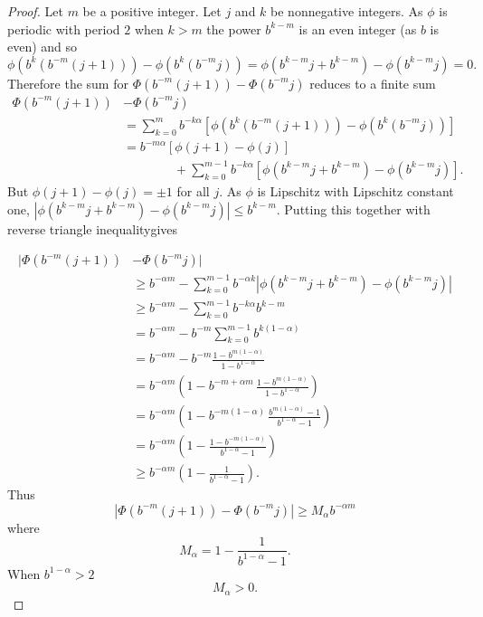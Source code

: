 \documentclass[12pt]{amsart}
\numberwithin{equation}{section}
\theoremstyle{definition}
\theoremstyle{remark}
\begin{document}
\begin{proof}
  Let $m$ be a positive integer.
  Let $j$ and $k$ be nonnegative integers.
  As $\phi$ is periodic with period $2$
  when  $k>m$ the power $b^{k-m}$ is an even integer (as $b$ is even)
  and so
$$
\phi(b^k(b^{-m}(j+1))) - \phi(b^k(b^{-m}j))
= \phi(b^{k-m}j + b^{k-m}) - \phi(b^{k-m}j) =0.
$$
Therefore the sum for $\Phi(b^{-m}(j+1))- \Phi(b^{-m}j)$ reduces to a finite
sum
\begin{align*}
  \Phi(b^{-m}(j+1))&- \Phi(b^{-m}j)
  \\
   &=
  \sum_{k=0}^m b^{-k\alpha}\left[\phi(b^k(b^{-m}(j+1))) - \phi(b^k(b^{-m}j))\right]\\
     &= b^{-m\alpha}\left[ \phi(j+1) - \phi(j)\right]\\
  &\qquad\qquad+ \sum_{k=0}^{m-1} b^{-k\alpha}
     \left[  \phi(b^{k-m}j + b^{k-m}) - \phi(b^{k-m}j)    \right]. 
\end{align*}
But $\phi(j+1) - \phi(j) = \pm 1$ for all $j$.
As  $\phi$ is Lipschitz with
Lipschitz constant one, 
$|\phi(b^{k-m}j + b^{k-m}) - \phi(b^{k-m}j)   |  \le  b^{k-m}$.
Putting this together with reverse triangle inequalitygives


\begingroup
\allowdisplaybreaks
\begin{align*}
    |\Phi(b^{-m}(j+1))&- \Phi(b^{-m}j)|\\
 &\ge  b^{-\alpha m} - \sum_{k=0}^{m-1} b^{-\alpha k} | \phi(b^{k-m}j + b^{k-m}) - \phi(b^{k-m}j)  |\\
 &\ge b^{-\alpha m} - \sum_{k=0}^{m-1} b^{-k\alpha} b^{k-m}\\
&= b^{-\alpha m} - b^{-m} \sum_{k=0}^{m-1} b^{k(1-\alpha)} \\
&= b^{-\alpha m} - b^{-m}                    
           \frac{1 - b^{m(1-\alpha)}}{1 - b^{1-\alpha}} \\
&= b^{-\alpha m} \left( 1 - b^{-m + \alpha m}\,  
                \frac{1 - b^{m(1-\alpha)}}{1 - b^{1-\alpha}}\right) \\
&= b^{-\alpha m} \left( 1 - b^{-m(1-\alpha)}\,  
                \frac{ b^{m(1-\alpha)}-1 }{ b^{1-\alpha}-1}\right) \\
&= b^{-\alpha m} \left( 1 - \frac{1 - b^{-m(1-\alpha)} }{ b^{1-\alpha}-1}\right)\\
&\ge b^{-\alpha m} \left( 1 - \frac{1  }{ b^{1-\alpha}-1}\right). 
\end{align*}%
\endgroup
Thus
\begin{equation}\label{eq:Phi-diff-lower}
    |\Phi(b^{-m}(j+1))- \Phi(b^{-m}j)| \ge M_\alpha b^{-\alpha m} 
\end{equation}
where
$$
M_\alpha =  1 - \frac{1  }{ b^{1-\alpha}-1}.
$$
When $b^{1-\alpha}>2$ 
$$
    M_\alpha >0.
$$


\end{proof}
\end{document}
